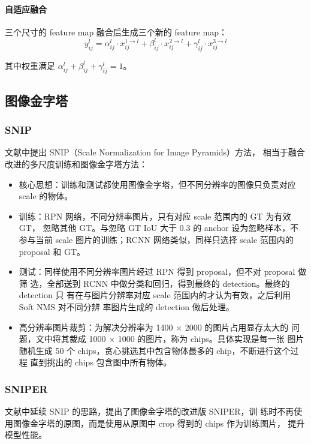 \paragraph{自适应融合}
三个尺寸的 feature map 融合后生成三个新的 feature map：
\begin{equation}
  y_{ij}^l = \alpha_{ij}^l \cdot x_{ij}^{1 \rightarrow l} + \beta_{ij}^l \cdot x_{ij}^{2 \rightarrow l}
  + \gamma_{ij}^l \cdot x_{ij}^{3 \rightarrow l}
\end{equation}

其中权重满足 $\alpha_{ij}^l + \beta_{ij}^l + \gamma_{ij}^l = 1$。

\subsection{图像金字塔}

\subsubsection{SNIP}
文献中提出 SNIP（Scale Normalization for Image Pyramids）方法，
相当于融合改进的多尺度训练和图像金字塔方法：

\begin{itemize}
  \item 核心思想：训练和测试都使用图像金字塔，但不同分辨率的图像只负责对应
    scale 的物体。
  \item 训练：RPN 网络，不同分辨率图片，只有对应 scale 范围内的 GT 为有效 GT，
    忽略其他 GT。与忽略 GT IoU 大于 0.3 的 anchor 设为忽略样本，不参与当前 scale
    图片的训练；RCNN 网络类似，同样只选择 scale 范围内的 proposal 和 GT。
  \item 测试：同样使用不同分辨率图片经过 RPN 得到 proposal，但不对 proposal 做筛
    选，全部送到 RCNN 中做分类和回归，得到最终的 detection。最终的 detection 只
    有在与图片分辨率对应 scale 范围内的才认为有效，之后利用 Soft NMS 对不同分辨
    率图片生成的 detection 做后处理。
  \item 高分辨率图片裁剪：为解决分辨率为 1400 $\times$ 2000 的图片占用显存太大的
    问题，文中将其裁成 1000 $\times$ 1000 的图片，称为 chips。具体实现是每一张
    图片随机生成 50 个 chips，贪心挑选其中包含物体最多的 chip，不断进行这个过程
    直到挑出的 chips 包含图中所有物体。
\end{itemize}

\subsubsection{SNIPER}
文献中延续 SNIP 的思路，提出了图像金字塔的改进版 SNIPER，训
练时不再使用图像金字塔的原图，而是使用从原图中 crop 得到的 chips 作为训练图片，
提升模型性能。

